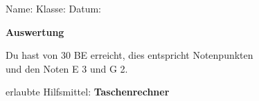 \documentclass[fleqn,leqno,12pt]{scrartcl} %
\theoremstyle{note}
\begin{document}
\begin{flushleft}
Name:\underline{\hspace{8cm}} \qquad
Klasse:\underline{\hspace{1.5cm}} \qquad
Datum:\underline{\hspace{2.5cm}}
\begin{framed}
\begin{center}
{\bf Auswertung}
\end{center}
Du hast \underline{\qquad} von 30 BE erreicht, dies entspricht \underline{\qquad} Notenpunkten \\
und den Noten E 3 und G 2.
\end{framed}

\begin{center}
erlaubte Hilfsmittel: {\bf Taschenrechner}
\end{center}


\end{flushleft}
\end{document}
